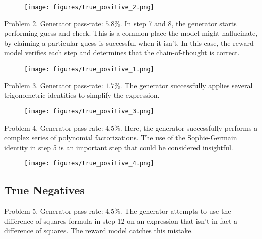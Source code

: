 \documentclass{article}
\begin{document}
\begin{figure}[!h]
\centering
\texttt{[image: figures/true\_positive\_2.png]}
\end{figure}

\newpage

\noindent
Problem 2. Generator pass-rate: $5.8\%$. In step 7 and 8, the generator starts performing guess-and-check. This is a common place the model might hallucinate, by claiming a particular guess is successful when it isn't. In this case, the reward model verifies each step and determines that the chain-of-thought is correct.

\vspace{.25cm}

\begin{figure}[!h]
\centering
\texttt{[image: figures/true\_positive\_1.png]}
\end{figure}

\vspace{1cm}

\noindent
Problem 3. Generator pass-rate: $1.7\%$. The generator successfully applies several trigonometric identities to simplify the expression.

\vspace{.25cm}

\begin{figure}[!h]
\centering
\texttt{[image: figures/true\_positive\_3.png]}
\end{figure}

\newpage

\noindent
Problem 4. Generator pass-rate: $4.5\%$. Here, the generator successfully performs a complex series of polynomial factorizations. The use of the Sophie-Germain identity in step 5 is an important step that could be considered insightful.

\vspace{.25cm}

\begin{figure}[!h]
\centering
\texttt{[image: figures/true\_positive\_4.png]}
\end{figure}

\subsection{True Negatives}

\noindent
Problem 5. Generator pass-rate: $4.5\%$. The generator attempts to use the difference of squares formula in step 12 on an expression that isn’t in fact a difference of squares. The reward model catches this mistake.
\end{document}
